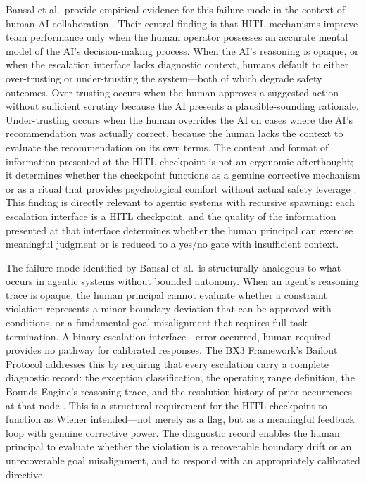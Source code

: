 Bansal et al.\ provide empirical evidence for this failure mode in the context of human-AI collaboration \cite{bansal2019}. Their central finding is that HITL mechanisms improve team performance only when the human operator possesses an accurate mental model of the AI's decision-making process. When the AI's reasoning is opaque, or when the escalation interface lacks diagnostic context, humans default to either over-trusting or under-trusting the system---both of which degrade safety outcomes. Over-trusting occurs when the human approves a suggested action without sufficient scrutiny because the AI presents a plausible-sounding rationale. Under-trusting occurs when the human overrides the AI on cases where the AI's recommendation was actually correct, because the human lacks the context to evaluate the recommendation on its own terms. The content and format of information presented at the HITL checkpoint is not an ergonomic afterthought; it determines whether the checkpoint functions as a genuine corrective mechanism or as a ritual that provides psychological comfort without actual safety leverage \cite{bansal2019}. This finding is directly relevant to agentic systems with recursive spawning: each escalation interface is a HITL checkpoint, and the quality of the information presented at that interface determines whether the human principal can exercise meaningful judgment or is reduced to a yes/no gate with insufficient context.

The failure mode identified by Bansal et al.\ is structurally analogous to what occurs in agentic systems without bounded autonomy. When an agent's reasoning trace is opaque, the human principal cannot evaluate whether a constraint violation represents a minor boundary deviation that can be approved with conditions, or a fundamental goal misalignment that requires full task termination. A binary escalation interface---error occurred, human required---provides no pathway for calibrated responses. The BX3 Framework's Bailout Protocol addresses this by requiring that every escalation carry a complete diagnostic record: the exception classification, the operating range definition, the Bounds Engine's reasoning trace, and the resolution history of prior occurrences at that node \cite{bailoutprotocol2026}. This is a structural requirement for the HITL checkpoint to function as Wiener intended---not merely as a flag, but as a meaningful feedback loop with genuine corrective power. The diagnostic record enables the human principal to evaluate whether the violation is a recoverable boundary drift or an unrecoverable goal misalignment, and to respond with an appropriately calibrated directive.

